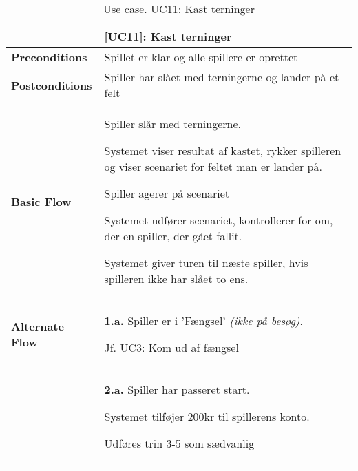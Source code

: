 \documentclass[class=article, crop=false]{standalone}
\begin{document}
    \begin{table}[H]
        \caption{Use case. UC11: Kast terninger}
        \begin{tabularx}{\textwidth}{|l|X|}
            \hline
            & \textbf{[UC11]: Kast terninger}   \\ \hline
            \textbf{Preconditions}       & Spillet er klar og alle spillere er oprettet\\ \hline
            \textbf{Postconditions}      & Spiller har slået med terningerne og lander på et felt\\ \hline


            \textbf{Basic Flow} & \begin{tabenum}
                                      \item Spiller slår med terningerne.
                                      \item Systemet viser resultat af kastet, rykker spilleren og viser scenariet for feltet man er lander på.
                                      \item Spiller agerer på scenariet
                                      \item Systemet udfører scenariet, kontrollerer for om, der en spiller, der gået fallit.
                                      \item Systemet giver turen til næste spiller, hvis spilleren ikke har slået to ens.
            \end{tabenum}   \\ \hline




            \textbf{Alternate Flow}   & \textbf{1.a.} Spiller er i 'Fængsel' \textit{(ikke på besøg)}.
            \begin{enumerate} \begin{tabenum}
                                  \item Jf. UC3: \underline{Kom ud af fængsel}
            \end{tabenum} \end{enumerate}
            \\


            & \textbf{2.a.} Spiller har passeret start.
            \begin{enumerate} \begin{tabenum}
                                  \item Systemet tilføjer 200kr til spillerens konto.
                                  \item Udføres trin 3-5 som sædvanlig
            \end{tabenum} \end{enumerate}
            \\



\end{tabularx}
\end{table}
\end{document}
